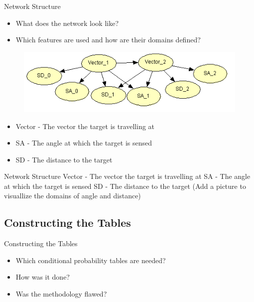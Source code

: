 \begin{frame}{Network Structure}
\begin{itemize}
\item What does the network look like?
\item Which features are used and how are their domains defined?
\end{itemize}

\begin{figure}
  \includegraphics[scale=0.8]{figures/BNDone.PNG}
\end{figure}

\begin{itemize}
  \item Vector - The vector the target is travelling at
  \item SA - The angle at which the target is sensed
  \item SD - The distance to the target
\end{itemize}
\end{frame}

\begin{frame}{Network Structure}
Vector - The vector the target is travelling at
SA - The angle at which the target is sensed
SD - The distance to the target
(Add a picture to visuallize the domains of angle and distance)
\end{frame}

\subsection{Constructing the Tables}
\begin{frame}{Constructing the Tables}
\begin{itemize}
\item Which conditional probability tables are needed?
\item How was it done? 
\item Was the methodology flawed?
\end{itemize}
\end{frame}


